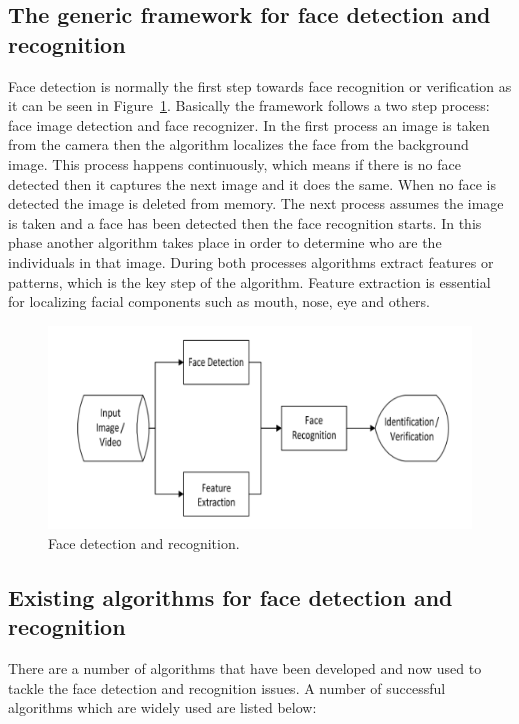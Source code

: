 \subsection{The generic framework for face detection and recognition}


Face detection is normally the first step towards face recognition or verification as it can be seen in  Figure~\ref{fig:framework}. Basically the framework follows a two step process: face image detection and face recognizer. In the first process an image is taken from the camera then the algorithm localizes the face from the background image. This process happens continuously, which means if there is no face detected then it captures the next image and it does the same. When no face is detected the image is deleted from memory. The next process assumes the image is taken and a face has been detected then the face recognition starts. In this phase another algorithm takes place in order to determine who are the individuals in that image. During both processes algorithms extract features or patterns, which is the key step of the algorithm. Feature extraction is essential for localizing facial components such as mouth, nose, eye and others. 

\begin{figure}[!htb]
    \centering
    \includegraphics[width=1\textwidth]{figures/framework.jpg}
    \caption{ Face detection and recognition.}
    \label{fig:framework}
\end{figure}


\subsection{Existing  algorithms  for  face detection and recognition}

There are a number of algorithms that have been developed and now used to tackle the face detection and recognition issues. A number of successful algorithms which are widely used are listed below: 

